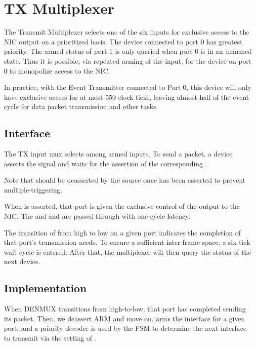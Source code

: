 
\section{TX Multiplexer}
The Transmit Multiplexer selects one of the six inputs for exclusive
access to the NIC output on a prioritized basis. The device connected
to port 0 has greatest priority. The armed status of port 1 is only
queried when port 0 is in an unarmed state. Thus it is possible, via
repeated arming of the input, for the device on port 0 to monopolize
access to the NIC.

In practice, with the Event Transmitter connected to Port 0, this
device will only have exclusive access for at most 550 clock ticks,
leaving almost half of the event cycle for data packet transmission
and other tasks.


\subsection{Interface}
The TX input mux selects among armed inputs. To send a packet, a
device asserts the  signal and waits for the assertion of
the corresponding .

Note that  should be deasserted by the source once
 has been asserted to prevent multiple-triggering.

When  is asserted, that port is given the exclusive
control of the output to the NIC. The  and and
 are passed through with one-cycle latency.

The transition of  from high to low on a given port
indicates the completion of that port's transmission needs. To ensure a sufficient inter-frame space, a six-tick wait cycle is entered. After that, the
multiplexer will then query the  status of the next device.


\subsection{Implementation}

When DENMUX transitions from high-to-low, that port has completed
sending its packet. Then, we deassert ARM and move on. 
arms the interface for a given port, and a priority decoder is used by
the FSM to determine the next interface to transmit via the setting of
.

